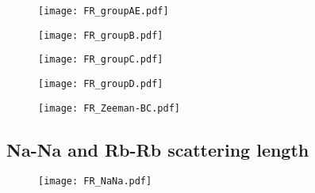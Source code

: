 \begin{figure}[tb]
\begin{center}
\texttt{[image: FR\_groupAE.pdf]}
\end{center}
\caption{}
\label{FR_groupAE}
\end{figure}

\begin{figure}[tb]
\begin{center}
\texttt{[image: FR\_groupB.pdf]}
\end{center}
\caption{}
\label{FR_groupB}
\end{figure}

\begin{figure}[tb]
\begin{center}
\texttt{[image: FR\_groupC.pdf]}
\end{center}
\caption{}
\label{FR_groupC}
\end{figure}

\begin{figure}[tb]
\begin{center}
\texttt{[image: FR\_groupD.pdf]}
\end{center}
\caption{}
\label{FR_groupD}
\end{figure}

\begin{figure}[tb]
\begin{center}
\texttt{[image: FR\_Zeeman-BC.pdf]}
\end{center}
\caption{}
\label{FR_Zeeman-BC}
\end{figure}

\subsection{Na-Na and Rb-Rb scattering length}

\begin{figure}[tb]
\begin{center}
\texttt{[image: FR\_NaNa.pdf]}
\end{center}
\caption{}
\label{FR_NaNa}
\end{figure}